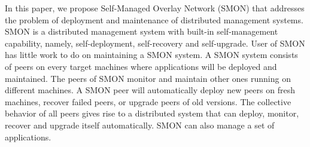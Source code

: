 
In this paper, we propose Self-Managed Overlay Network
(SMON) that addresses the problem of deployment and
maintenance of distributed management systems.  SMON is a
distributed management system with built-in self-management
capability, namely, self-deployment, self-recovery and
self-upgrade. User of SMON has little work to do on
maintaining a SMON system. A SMON system consists of peers
on every target machines where applications will be deployed
and maintained. The peers of SMON monitor and maintain other
ones running on different machines. A SMON peer will
automatically deploy new peers on fresh machines, recover
failed peers, or upgrade peers of old versions. The
collective behavior of all peers gives rise to a distributed
system that can deploy, monitor, recover and upgrade itself
automatically. SMON can also manage a set of applications.


